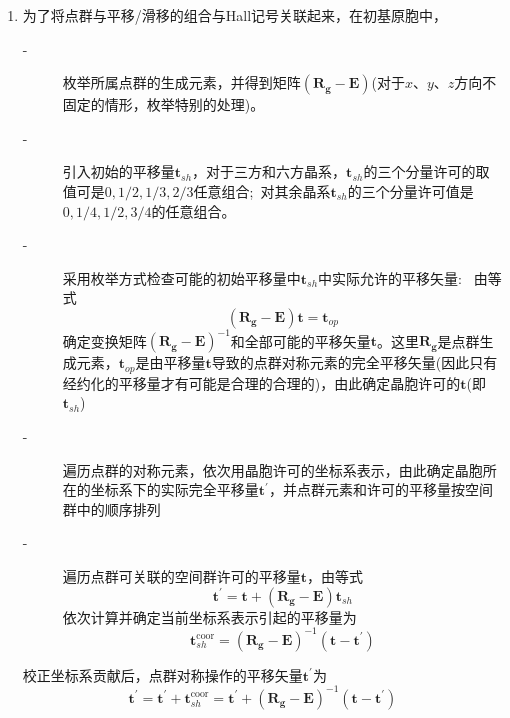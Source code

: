 \documentclass{article}      %
\begin{document}
\begin{enumerate}
	\item 为了将点群与平移/滑移的组合与\textrm{Hall}记号关联起来，在初基原胞中，
		\begin{description}
			\item[-] 枚举所属点群的生成元素，并得到矩阵$(\mathbf{R_g}-\mathbf{E})$(对于$x$、$y$、$z$方向不固定的情形，枚举特别的处理)。
			\item[-] 引入初始的平移量$\mathbf{t}_{sh}$，对于三方和六方晶系，$\mathbf{t}_{sh}$的三个分量许可的取值可是$0,1/2,1/3,2/3$任意组合;~对其余晶系$\mathbf{t}_{sh}$的三个分量许可值是$0,1/4,1/2,3/4$的任意组合。
			\item[-]采用枚举方式检查可能的初始平移量中$\mathbf{t}_{sh}$中实际允许的平移矢量:~
				由等式
				\begin{displaymath}
					(\mathbf{R_g}-\mathbf{E})\mathbf{t}=\mathbf{t}_{op}
				\end{displaymath}
确定变换矩阵$(\mathbf{R_g}-\mathbf{E})^{-1}$和全部可能的平移矢量$\mathbf{t}$。这里$\mathbf{R_g}$是点群生成元素，$\mathbf{t}_{op}$是由平移量$\mathbf{t}$导致的点群对称元素的完全平移矢量(因此只有经约化的平移量才有可能是合理的合理的)，由此确定晶胞许可的$\mathbf{t}$(即$\mathbf{t}_{sh}$)
			\item[-] 遍历点群的对称元素，依次用晶胞许可的坐标系表示，由此确定晶胞所在的坐标系下的实际完全平移量$\mathbf{t}^{\prime}$，并点群元素和许可的平移量按空间群中的顺序排列
			\item[-] 遍历点群可关联的空间群许可的平移量$\mathbf{t}$，由等式
		\begin{displaymath}
			\mathbf{t}^{\prime}=\mathbf{t}+(\mathbf{R_g}-\mathbf{E})\mathbf{t}_{sh}
		\end{displaymath}
		依次计算并确定当前坐标系表示引起的平移量为
		\begin{displaymath}
			\mathbf{t}_{sh}^{\mathrm{coor}}=(\mathbf{R_g}-\mathbf{E})^{-1}(\mathbf{t}-\mathbf{t}^{\prime})
		\end{displaymath}
		\end{description}
		校正坐标系贡献后，点群对称操作的平移矢量$\mathbf{t}^{\prime}$为
		\begin{displaymath}
			\mathbf{t}^{\prime}=\mathbf{t}^{\prime}+\mathbf{t}_{sh}^{\mathrm{coor}}=\mathbf{t}^{\prime}+(\mathbf{R_g}-\mathbf{E})^{-1}(\mathbf{t}-\mathbf{t}^{\prime})
		\end{displaymath}


\end{enumerate}
\end{document}
